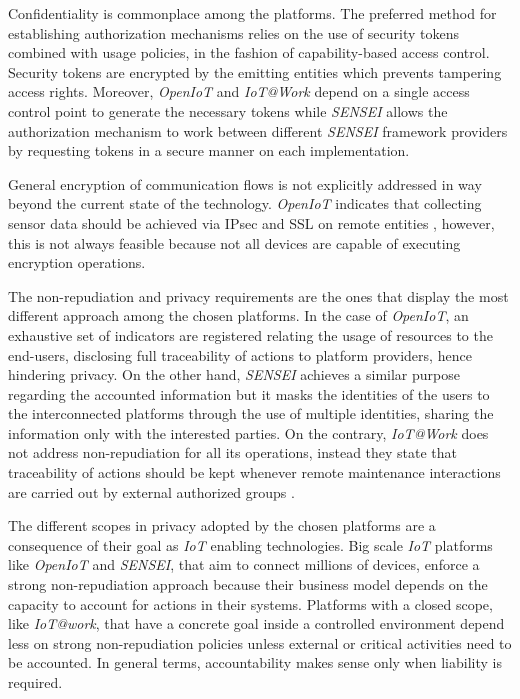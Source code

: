 \documentclass[journal]{IEEEtran}
\begin{document}
  Confidentiality is commonplace among the platforms. The preferred method for establishing authorization mechanisms relies on the use of security tokens combined with usage policies, in the fashion of capability-based access control. Security tokens are encrypted by the emitting entities which prevents tampering access rights. Moreover, \emph{OpenIoT} and \emph{IoT@Work} depend on a single access control point to generate the necessary tokens while \emph{SENSEI} allows the authorization mechanism to work between different \emph{SENSEI} framework providers by requesting tokens in a secure manner on each implementation.

  General encryption of communication flows is not explicitly addressed in way beyond the current state of the technology. \emph{OpenIoT} indicates that collecting sensor data should be achieved via IPsec and SSL on remote entities \cite{Dimitropoulus2012}, however, this is not always feasible because not all devices are capable of executing encryption operations.

  The non-repudiation and privacy requirements are the ones that display the most different approach among the chosen platforms. In the case of \emph{OpenIoT}, an exhaustive set of indicators are registered relating the usage of resources to the end-users, disclosing full traceability of actions to platform providers, hence hindering privacy. On the other hand, \emph{SENSEI} achieves a similar purpose regarding the accounted information but it masks the identities of the users to the interconnected platforms through the use of multiple identities, sharing the information only with the interested parties. On the contrary, \emph{IoT@Work} does not address non-repudiation for all its operations, instead they state that traceability of actions should be kept whenever remote maintenance interactions are carried out by external authorized groups \cite{Huth2010}.
  
  The different scopes in privacy adopted by the chosen platforms are a consequence of their goal as \emph{IoT} enabling technologies. Big scale \emph{IoT} platforms like \emph{OpenIoT} and \emph{SENSEI}, that aim to connect millions of devices,  enforce a strong non-repudiation approach because their business model depends on the capacity to account for actions in their systems. Platforms with a closed scope, like \emph{IoT@work}, that have a concrete goal inside a controlled environment depend less on strong non-repudiation policies unless external or critical activities need to be accounted. In general terms, accountability makes sense only when liability is required.  
\end{document}

